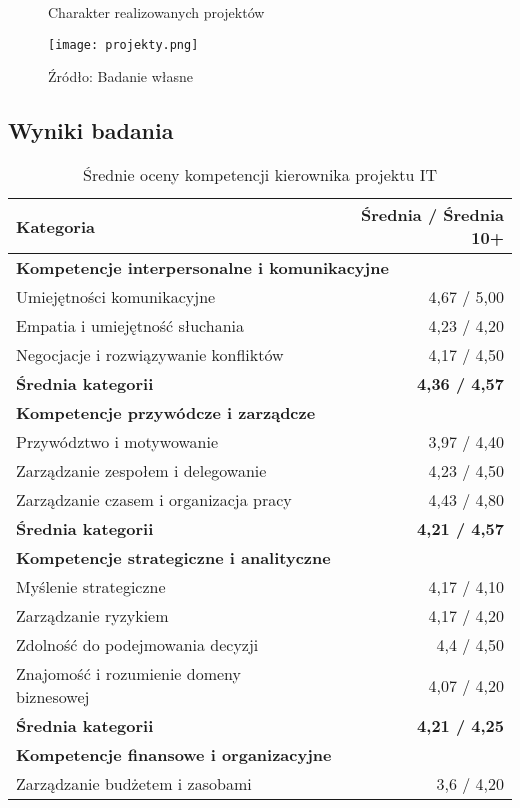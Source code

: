 \begin{figure}
  \caption{Charakter realizowanych projektów}
  \centering
  \texttt{[image: projekty.png]}
  \caption*{Źródło: Badanie własne}
\end{figure}

\subsection{Wyniki badania}

\begin{table}[htbp]
\centering
\caption{Średnie oceny kompetencji kierownika projektu IT}
\begin{tabular}{p{8cm} r}
\toprule
\textbf{Kategoria} & \textbf{Średnia / Średnia 10+} \\
\midrule
\multicolumn{2}{l}{\textbf{Kompetencje interpersonalne i komunikacyjne}} \\
Umiejętności komunikacyjne & 4{,}67 / 5{,}00 \\
Empatia i umiejętność słuchania & 4{,}23 / 4{,}20 \\
Negocjacje i rozwiązywanie konfliktów & 4{,}17 / 4{,}50 \\
\textbf{Średnia kategorii} & \textbf{4{,}36 / 4{,}57} \\  
\midrule
\multicolumn{2}{l}{\textbf{Kompetencje przywódcze i zarządcze}} \\
Przywództwo i motywowanie & 3{,}97 / 4{,}40 \\
Zarządzanie zespołem i delegowanie & 4{,}23 / 4{,}50 \\
Zarządzanie czasem i organizacja pracy & 4{,}43 / 4{,}80 \\
\textbf{Średnia kategorii} & \textbf{4{,}21 / 4{,}57} \\
\midrule
\multicolumn{2}{l}{\textbf{Kompetencje strategiczne i analityczne}} \\
Myślenie strategiczne & 4{,}17 / 4{,}10 \\
Zarządzanie ryzykiem & 4{,}17 / 4{,}20 \\
Zdolność do podejmowania decyzji & 4{,}4 / 4{,}50 \\
Znajomość i rozumienie domeny biznesowej & 4{,}07 / 4{,}20 \\
\textbf{Średnia kategorii} & \textbf{4{,}21 / 4{,}25} \\
\midrule
\multicolumn{2}{l}{\textbf{Kompetencje finansowe i organizacyjne}} \\
Zarządzanie budżetem i zasobami & 3{,}6 / 4{,}20 \\

\end{tabular}
\end{table}
